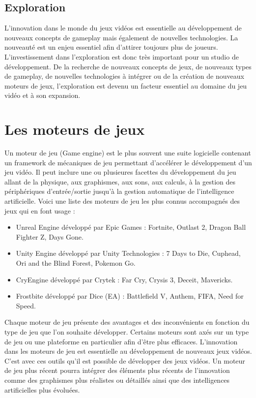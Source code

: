 \subsection{Exploration}
L'innovation dans le monde du jeux vidéos est essentielle au développement de nouveaux concepts de gameplay mais également de nouvelles technologies. La nouveauté est un enjeu essentiel afin d'attirer toujours plus de joueurs. L'investissement dans l'exploration est donc très important pour un studio de développement. De la recherche de nouveaux concepts de jeux, de nouveaux types de gameplay, de nouvelles technologies à intégrer ou de la création de nouveaux moteurs de jeux, l'exploration est devenu un facteur essentiel au domaine du jeu vidéo et à son expansion.



\section{Les moteurs de jeux}
Un moteur de jeu (Game engine) est le plus souvent une suite logicielle contenant un framework de mécaniques de jeu permettant d'accélérer le développement d'un jeu vidéo. Il peut inclure une ou plusieures facettes du développement du jeu allant de la physique, aux graphismes, aux sons, aux calculs, à la gestion des périphériques d'entrée/sortie jusqu'à la gestion automatique de l'intelligence artificielle. Voici une liste des moteurs de jeu les plus connus accompagnés des jeux qui en font usage : 
\begin{itemize}
    \item Unreal Engine \cite{UnrealEngine} développé par Epic Games : Fortnite, Outlast 2, Dragon Ball Fighter Z, Days Gone.
    \item Unity Engine \cite{UnityEngine} développé par Unity Technologies : 7 Days to Die, Cuphead, Ori and the Blind Forest, Pokemon Go.
    \item CryEngine \cite{CryEngine} développé par Crytek : Far Cry, Crysis 3, Deceit, Mavericks.
    \item Frostbite \cite{FrostbiteEngine} développé par Dice (EA) : Battlefield V, Anthem, FIFA, Need for Speed.
\end{itemize}

Chaque moteur de jeu présente des avantages et des inconvénients en fonction du type de jeu que l'on souhaite développer. Certains moteurs sont axés sur un type de jeu ou une plateforme en particulier afin d'être plus efficaces. L'innovation dans les moteurs de jeu est essentielle au développement de nouveaux jeux vidéos. C'est avec ces outils qu'il est possible de développer des jeux vidéos. Un moteur de jeu plus récent pourra intégrer des éléments plus récents de l'innovation comme des graphismes plus réalistes ou détaillés ainsi que des intelligences artificielles plus évoluées.

